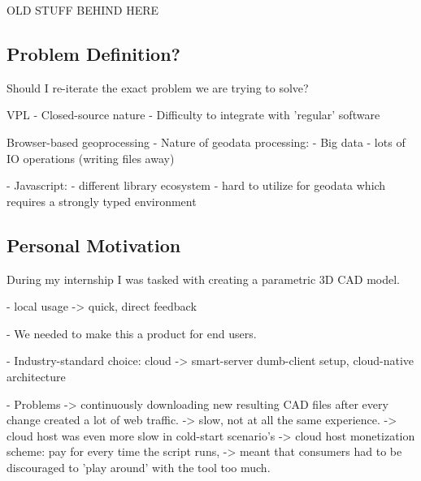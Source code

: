 \begin{note}
  OLD STUFF BEHIND HERE
\end{note}


\subsection{Problem Definition?}

Should I re-iterate the exact problem we are trying to solve? 

VPL
- Closed-source nature 
- Difficulty to integrate with 'regular' software

Browser-based geoprocessing
- Nature of geodata processing: 
  - Big data 
  - lots of IO operations (writing files away)

- Javascript:
  - different library ecosystem 
  - hard to utilize for geodata which requires a strongly typed environment 



\subsection{Personal Motivation}
During my internship I was tasked with creating a parametric 3D CAD model. 


- local usage 
  -> quick, direct feedback

- We needed to make this a product for end users. 

- Industry-standard choice: cloud 
  -> smart-server dumb-client setup, cloud-native architecture 

- Problems
  -> continuously downloading new resulting CAD files after every change created a lot of web traffic. 
  -> slow, not at all the same experience.
  -> cloud host was even more slow in cold-start scenario's   
  -> cloud host monetization scheme: pay for every time the script runs, 
     -> meant that consumers had to be discouraged to 'play around' with the tool too much. 
  
